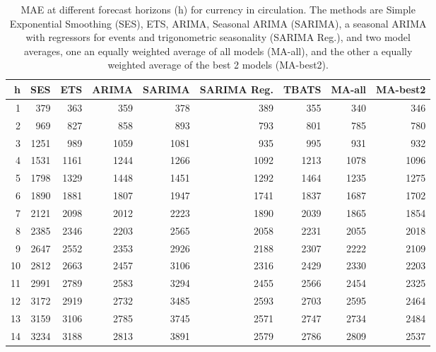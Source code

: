 \documentclass{article}
\begin{document}
\begin{table}[ht]
\centering
\begin{tabular}{rrrrrrrrr}
  \hline
h & SES & ETS & ARIMA & SARIMA & SARIMA Reg. & TBATS & MA-all & MA-best2 \\ 
  \hline
1 & 379 & 363 & 359 & 378 & 389 & 355 & 340 & 346 \\ 
  2 & 969 & 827 & 858 & 893 & 793 & 801 & 785 & 780 \\ 
  3 & 1251 & 989 & 1059 & 1081 & 935 & 995 & 931 & 932 \\ 
  4 & 1531 & 1161 & 1244 & 1266 & 1092 & 1213 & 1078 & 1096 \\ 
  5 & 1798 & 1329 & 1448 & 1451 & 1292 & 1464 & 1235 & 1275 \\ 
  6 & 1890 & 1881 & 1807 & 1947 & 1741 & 1837 & 1687 & 1702 \\ 
  7 & 2121 & 2098 & 2012 & 2223 & 1890 & 2039 & 1865 & 1854 \\ 
  8 & 2385 & 2346 & 2203 & 2565 & 2058 & 2231 & 2055 & 2018 \\ 
  9 & 2647 & 2552 & 2353 & 2926 & 2188 & 2307 & 2222 & 2109 \\ 
  10 & 2812 & 2663 & 2457 & 3106 & 2316 & 2429 & 2330 & 2203 \\ 
  11 & 2991 & 2789 & 2583 & 3294 & 2455 & 2566 & 2454 & 2325 \\ 
  12 & 3172 & 2919 & 2732 & 3485 & 2593 & 2703 & 2595 & 2464 \\ 
  13 & 3159 & 3106 & 2785 & 3745 & 2571 & 2747 & 2734 & 2484 \\ 
  14 & 3234 & 3188 & 2813 & 3891 & 2579 & 2786 & 2809 & 2537 \\ 
   \hline
\end{tabular}
\caption{MAE at different forecast horizons (h) for currency in circulation. The methods are Simple Exponential Smoothing (SES), ETS, ARIMA, Seasonal ARIMA (SARIMA), a seasonal ARIMA with regressors for events and trigonometric seasonality (SARIMA Reg.), and two model averages, one an equally weighted average of all models (MA-all), and the other a equally weighted average of the best 2 models (MA-best2).} 
\label{tab:maecic}
\end{table}
\end{document}
